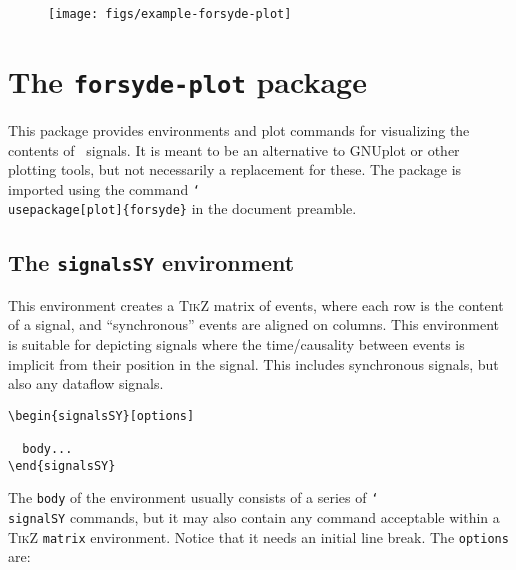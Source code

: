 \begin{figure}[htb]\centering
\texttt{[image: figs/example-forsyde-plot]}
\end{figure}

\newpage

\section{The \texttt{forsyde-plot} package}
\label{sec:forsyde-plot-package}


This package provides environments and plot commands for visualizing the contents of \ForSyDe\ signals. It is meant to be an alternative to GNUplot or other plotting tools, but not necessarily a replacement for these. The package is imported using the command \texttt{\char`\\usepackage[plot]\{forsyde\}} in the document preamble.

\subsection{The \texttt{signalsSY} environment}
\label{sec:plot-signalsSY}


This environment creates a \textsc{TikZ} matrix of events, where each row is the content of a signal, and ``synchronous'' events are aligned on columns. This environment is suitable for depicting signals where the time/causality between events is implicit from their position in the signal. This includes synchronous signals, but also any dataflow signals.

\begin{verbatim}
\begin{signalsSY}[options]

  body...
\end{signalsSY}
\end{verbatim}

The \texttt{body} of the environment usually consists of a series of \texttt{\char`\\signalSY} commands, but it may also contain any command acceptable within a \textsc{TikZ} \texttt{matrix} environment. Notice that it needs an initial line break. The \texttt{options} are:

